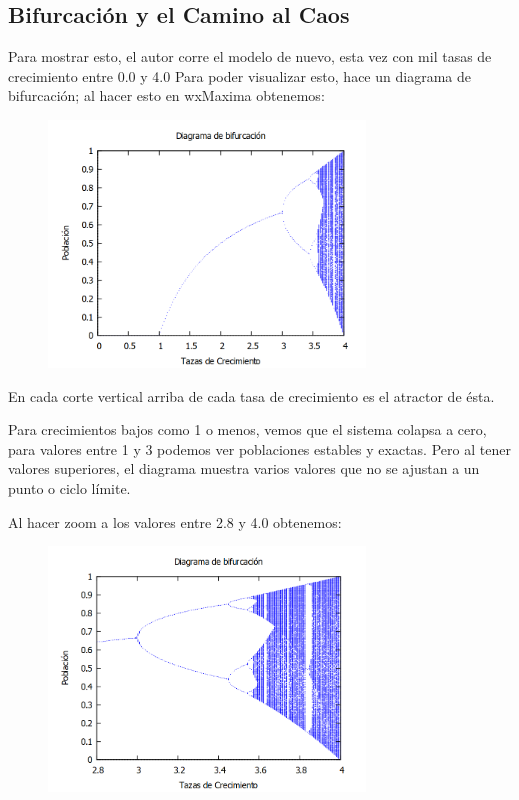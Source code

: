 \documentclass[a4paper]{article}
\begin{document}
\subsection{Bifurcación y el Camino al Caos}
Para mostrar esto, el autor corre el modelo de nuevo, esta vez con mil tasas de crecimiento entre 0.0 y 4.0 Para poder visualizar esto, hace un diagrama de bifurcación; al hacer esto en wxMaxima obtenemos:

\begin{figure}[!ht]
 \centering
  \includegraphics[width=0.75\textwidth]{Bifurcacion0-4.png}
\end{figure}

En cada corte vertical arriba de cada tasa de crecimiento es el atractor de ésta. 

Para crecimientos bajos como 1 o menos, vemos que el sistema colapsa a cero, para valores entre 1 y 3 podemos ver poblaciones estables y exactas. Pero al tener valores superiores, el diagrama muestra varios valores que no se ajustan a un punto o ciclo límite.


Al hacer zoom a los valores entre 2.8 y 4.0 obtenemos:

\begin{figure}[!ht]
 \centering
  \includegraphics[width=0.75\textwidth]{Bifurcacion28-4.png}
\end{figure}
\end{document}
